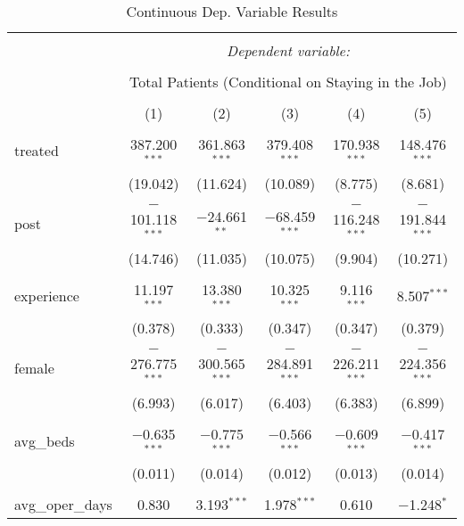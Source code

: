 
\begin{table}[!htbp] \centering 
  \caption{Continuous Dep. Variable Results} 
  \label{} 
  \begin{adjustbox}{width=\textwidth}
\begin{tabular}{@{\extracolsep{5pt}}lccccc} 
\\[-1.8ex]\hline 
\hline \\[-1.8ex] 
 & \multicolumn{5}{c}{\textit{Dependent variable:}} \\ 
\cline{2-6} 
\\[-1.8ex] & \multicolumn{5}{c}{Total Patients (Conditional on Staying in the Job)} \\ 
\\[-1.8ex] & (1) & (2) & (3) & (4) & (5)\\ 
\hline \\[-1.8ex] 
 treated & 387.200$^{***}$ & 361.863$^{***}$ & 379.408$^{***}$ & 170.938$^{***}$ & 148.476$^{***}$ \\ 
  & (19.042) & (11.624) & (10.089) & (8.775) & (8.681) \\ 
  & & & & & \\ 
 post & $-$101.118$^{***}$ & $-$24.661$^{**}$ & $-$68.459$^{***}$ & $-$116.248$^{***}$ & $-$191.844$^{***}$ \\ 
  & (14.746) & (11.035) & (10.075) & (9.904) & (10.271) \\ 
  & & & & & \\ 
 experience & 11.197$^{***}$ & 13.380$^{***}$ & 10.325$^{***}$ & 9.116$^{***}$ & 8.507$^{***}$ \\ 
  & (0.378) & (0.333) & (0.347) & (0.347) & (0.379) \\ 
  & & & & & \\ 
 female & $-$276.775$^{***}$ & $-$300.565$^{***}$ & $-$284.891$^{***}$ & $-$226.211$^{***}$ & $-$224.356$^{***}$ \\ 
  & (6.993) & (6.017) & (6.403) & (6.383) & (6.899) \\ 
  & & & & & \\ 
 avg\_beds & $-$0.635$^{***}$ & $-$0.775$^{***}$ & $-$0.566$^{***}$ & $-$0.609$^{***}$ & $-$0.417$^{***}$ \\ 
  & (0.011) & (0.014) & (0.012) & (0.013) & (0.014) \\ 
  & & & & & \\ 
 avg\_oper\_days & 0.830 & 3.193$^{***}$ & 1.978$^{***}$ & 0.610 & $-$1.248$^{*}$ \\ 

\end{tabular}
\end{adjustbox}
\end{table}
